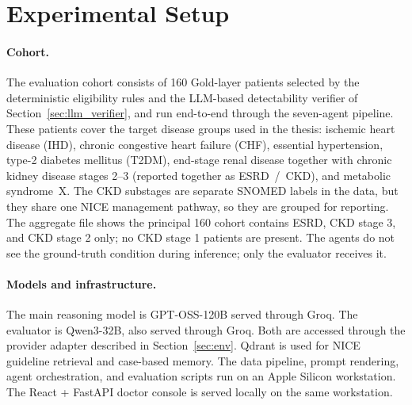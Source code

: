 \section{Experimental Setup}
\label{sec:results_setup}

\paragraph{Cohort.} The evaluation cohort consists of 160 Gold-layer
patients selected by the deterministic eligibility rules and the LLM-based
detectability verifier of Section~\ref{sec:llm_verifier}, and run end-to-end
through the seven-agent pipeline. These patients cover
the target disease groups used in the thesis: ischemic heart disease (IHD),
chronic congestive heart failure (CHF), essential hypertension, type-2
diabetes mellitus (T2DM), end-stage renal disease together with chronic
kidney disease stages 2--3 (reported together as ESRD~/~CKD), and
metabolic syndrome~X. The CKD substages are separate SNOMED labels in
the data, but they share one NICE management pathway, so they are
grouped for reporting. The aggregate file shows the principal 160 cohort
contains ESRD, CKD stage 3, and CKD stage 2 only; no CKD stage 1
patients are present. The agents do not see
the ground-truth condition during inference; only the evaluator receives it.

\paragraph{Models and infrastructure.}
The main reasoning model is GPT-OSS-120B served through Groq. The evaluator is
Qwen3-32B, also served through Groq. Both are accessed through the provider
adapter described in Section~\ref{sec:env}. Qdrant is used for NICE guideline
retrieval and case-based memory. The data pipeline, prompt rendering, agent
orchestration, and evaluation scripts run on an Apple Silicon workstation. The
React + FastAPI doctor console is served locally on the same workstation.

